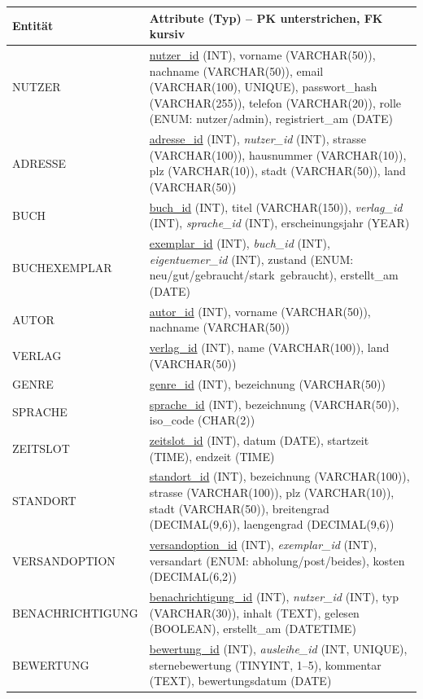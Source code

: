 \documentclass[11pt,a4paper]{article}
\begin{document}
{\fontsize{9}{10}\selectfont
\begin{longtable}{@{}p{3.6cm}p{10.4cm}@{}}
\toprule
\textbf{Entität} & \textbf{Attribute (Typ) -- PK unterstrichen, FK kursiv} \\
\midrule
\endhead
NUTZER & \underline{nutzer\_id} (INT), vorname (VARCHAR(50)), nachname (VARCHAR(50)), email (VARCHAR(100), UNIQUE), passwort\_hash (VARCHAR(255)), telefon (VARCHAR(20)), rolle (ENUM: nutzer/admin), registriert\_am (DATE) \\
ADRESSE & \underline{adresse\_id} (INT), \textit{nutzer\_id} (INT), strasse (VARCHAR(100)), hausnummer (VARCHAR(10)), plz (VARCHAR(10)), stadt (VARCHAR(50)), land (VARCHAR(50)) \\
BUCH & \underline{buch\_id} (INT), titel (VARCHAR(150)), \textit{verlag\_id} (INT), \textit{sprache\_id} (INT), erscheinungsjahr (YEAR) \\
BUCHEXEMPLAR & \underline{exemplar\_id} (INT), \textit{buch\_id} (INT), \textit{eigentuemer\_id} (INT), zustand (ENUM: neu/gut/gebraucht/stark~gebraucht), erstellt\_am (DATE) \\
AUTOR & \underline{autor\_id} (INT), vorname (VARCHAR(50)), nachname (VARCHAR(50)) \\
VERLAG & \underline{verlag\_id} (INT), name (VARCHAR(100)), land (VARCHAR(50)) \\
GENRE & \underline{genre\_id} (INT), bezeichnung (VARCHAR(50)) \\
SPRACHE & \underline{sprache\_id} (INT), bezeichnung (VARCHAR(50)), iso\_code (CHAR(2)) \\
ZEITSLOT & \underline{zeitslot\_id} (INT), datum (DATE), startzeit (TIME), endzeit (TIME) \\
STANDORT & \underline{standort\_id} (INT), bezeichnung (VARCHAR(100)), strasse (VARCHAR(100)), plz (VARCHAR(10)), stadt (VARCHAR(50)), breitengrad (DECIMAL(9,6)), laengengrad (DECIMAL(9,6)) \\
VERSANDOPTION & \underline{versandoption\_id} (INT), \textit{exemplar\_id} (INT), versandart (ENUM: abholung/post/beides), kosten (DECIMAL(6,2)) \\
BENACHRICHTIGUNG & \underline{benachrichtigung\_id} (INT), \textit{nutzer\_id} (INT), typ (VARCHAR(30)), inhalt (TEXT), gelesen (BOOLEAN), erstellt\_am (DATETIME) \\
BEWERTUNG & \underline{bewertung\_id} (INT), \textit{ausleihe\_id} (INT, UNIQUE), sternebewertung (TINYINT, 1--5), kommentar (TEXT), bewertungsdatum (DATE) \\
\bottomrule
\end{longtable}
}
\end{document}
